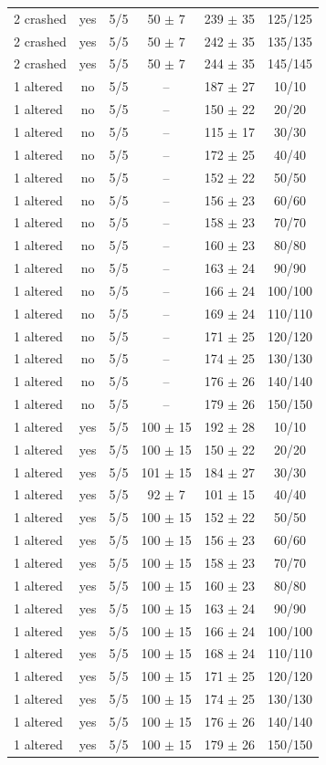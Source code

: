 \begin{tabular}{lccccc}
2 crashed & yes & 5/5 & 50 $\pm$ 7 & 239 $\pm$ 35 & 125/125 \\
2 crashed & yes & 5/5 & 50 $\pm$ 7 & 242 $\pm$ 35 & 135/135 \\
2 crashed & yes & 5/5 & 50 $\pm$ 7 & 244 $\pm$ 35 & 145/145 \\
1 altered & no & 5/5 & -- & 187 $\pm$ 27 & 10/10 \\
1 altered & no & 5/5 & -- & 150 $\pm$ 22 & 20/20 \\
1 altered & no & 5/5 & -- & 115 $\pm$ 17 & 30/30 \\
1 altered & no & 5/5 & -- & 172 $\pm$ 25 & 40/40 \\
1 altered & no & 5/5 & -- & 152 $\pm$ 22 & 50/50 \\
1 altered & no & 5/5 & -- & 156 $\pm$ 23 & 60/60 \\
1 altered & no & 5/5 & -- & 158 $\pm$ 23 & 70/70 \\
1 altered & no & 5/5 & -- & 160 $\pm$ 23 & 80/80 \\
1 altered & no & 5/5 & -- & 163 $\pm$ 24 & 90/90 \\
1 altered & no & 5/5 & -- & 166 $\pm$ 24 & 100/100 \\
1 altered & no & 5/5 & -- & 169 $\pm$ 24 & 110/110 \\
1 altered & no & 5/5 & -- & 171 $\pm$ 25 & 120/120 \\
1 altered & no & 5/5 & -- & 174 $\pm$ 25 & 130/130 \\
1 altered & no & 5/5 & -- & 176 $\pm$ 26 & 140/140 \\
1 altered & no & 5/5 & -- & 179 $\pm$ 26 & 150/150 \\
1 altered & yes & 5/5 & 100 $\pm$ 15 & 192 $\pm$ 28 & 10/10 \\
1 altered & yes & 5/5 & 100 $\pm$ 15 & 150 $\pm$ 22 & 20/20 \\
1 altered & yes & 5/5 & 101 $\pm$ 15 & 184 $\pm$ 27 & 30/30 \\
1 altered & yes & 5/5 & 92 $\pm$ 7 & 101 $\pm$ 15 & 40/40 \\
1 altered & yes & 5/5 & 100 $\pm$ 15 & 152 $\pm$ 22 & 50/50 \\
1 altered & yes & 5/5 & 100 $\pm$ 15 & 156 $\pm$ 23 & 60/60 \\
1 altered & yes & 5/5 & 100 $\pm$ 15 & 158 $\pm$ 23 & 70/70 \\
1 altered & yes & 5/5 & 100 $\pm$ 15 & 160 $\pm$ 23 & 80/80 \\
1 altered & yes & 5/5 & 100 $\pm$ 15 & 163 $\pm$ 24 & 90/90 \\
1 altered & yes & 5/5 & 100 $\pm$ 15 & 166 $\pm$ 24 & 100/100 \\
1 altered & yes & 5/5 & 100 $\pm$ 15 & 168 $\pm$ 24 & 110/110 \\
1 altered & yes & 5/5 & 100 $\pm$ 15 & 171 $\pm$ 25 & 120/120 \\
1 altered & yes & 5/5 & 100 $\pm$ 15 & 174 $\pm$ 25 & 130/130 \\
1 altered & yes & 5/5 & 100 $\pm$ 15 & 176 $\pm$ 26 & 140/140 \\
1 altered & yes & 5/5 & 100 $\pm$ 15 & 179 $\pm$ 26 & 150/150 \\
\hline
\end{tabular}
